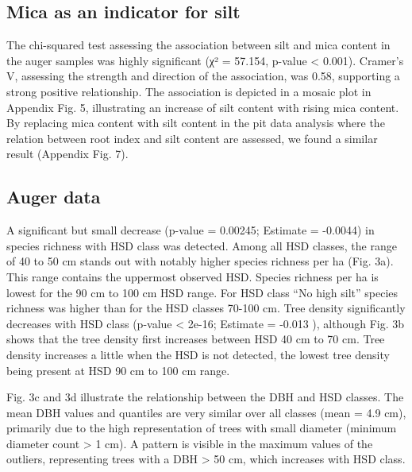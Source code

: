 \documentclass[fleqn,11pt]{latex/stylish_article} %
\begin{document}
\normalsize

\hypertarget{mica-as-an-indicator-for-silt}{%
\subsection{Mica as an indicator for silt}\label{mica-as-an-indicator-for-silt}}

The chi-squared test assessing the association between silt and mica content in the auger samples was highly significant (χ² = 57.154, p-value \textless{} 0.001). Cramer's V, assessing the strength and direction of the association, was 0.58, supporting a strong positive relationship. The association is depicted in a mosaic plot in Appendix Fig. 5, illustrating an increase of silt content with rising mica content. By replacing mica content with silt content in the pit data analysis where the relation between root index and silt content are assessed, we found a similar result (Appendix Fig. 7).

\hypertarget{auger-data}{%
\subsection{Auger data}\label{auger-data}}

A significant but small decrease (p-value = 0.00245; Estimate = -0.0044) in species richness with HSD class was detected. Among all HSD classes, the range of 40 to 50 cm stands out with notably higher species richness per ha (Fig. 3a). This range contains the uppermost observed HSD. Species richness per ha is lowest for the 90 cm to 100 cm HSD range. For HSD class \enquote{No high silt} species richness was higher than for the HSD classes 70-100 cm. Tree density significantly decreases with HSD class (p-value \textless{} 2e-16; Estimate = -0.013 ), although Fig. 3b shows that the tree density first increases between HSD 40 cm to 70 cm. Tree density increases a little when the HSD is not detected, the lowest tree density being present at HSD 90 cm to 100 cm range.

Fig. 3c and 3d illustrate the relationship between the DBH and HSD classes. The mean DBH values and quantiles are very similar over all classes (mean = 4.9 cm), primarily due to the high representation of trees with small diameter (minimum diameter count \textgreater{} 1 cm). A pattern is visible in the maximum values of the outliers, representing trees with a DBH \textgreater{} 50 cm, which increases with HSD class.
\end{document}
